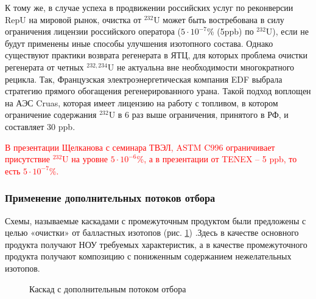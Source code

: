 К тому же, в случае успеха в продвижении российских услуг по реконверсии RepU на мировой рынок, очистка от $^{232}$U может быть востребована в силу ограничения лицензии российского оператора ($5\cdot10^{-7}$\% (5ppb) по $^{232}$U), если не будут применены иные способы улучшения изотопного состава.
Однако существуют практики возврата регенерата в ЯТЦ, для которых проблема очистки регенерата от четных $^{232,234}$U не актуальна вне необходимости многократного рецикла. Так, Французская электроэнергетическая компания EDF выбрала стратегию прямого обогащения регенерированного урана. Такой подход воплощен на АЭС Cruas, которая имеет лицензию на работу с топливом, в котором ограничение содержания $^{232}$U в 6 раз выше ограничения, принятого в РФ, и составляет 30 ppb.

\textcolor{red}{В презентации Щелканова с семинара ТВЭЛ, ASTM C996 ограничивает присутствие $^{232}$U на уровне $5\cdot10^{-6}$\%, а в презентации от TENEX -- 5 ppb, то есть $5\cdot10^{-7}$\%.}

\subsubsection{Применение дополнительных потоков отбора}
Схемы, называемые каскадами с промежуточным продуктом были предложены с целью «очистки» от балластных изотопов (рис. \ref{fig:3_out}) \cite{palkinAnaliticheskiyRaschetSoderzhaniya2007}.Здесь в качестве основного продукта получают НОУ требуемых характеристик, а в качестве промежуточного продукта получают композицию с пониженным содержанием нежелательных изотопов.
\begin{figure}[ht]
  \caption{Каскад с дополнительным потоком отбора}\label{fig:3_out}
\end{figure}

